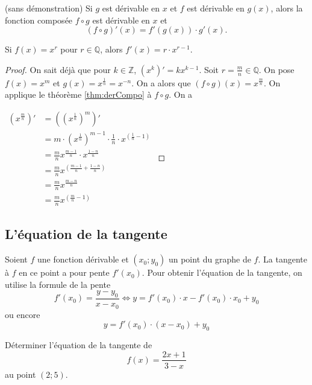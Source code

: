 \documentclass[a4paper,12pt]{article}
\begin{document}
\begin{thm}[label=thm:derCompo]
	(sans démonstration)
	\tcblower
	Si $g$ est dérivable en $x$ et $f$ est dérivable en $g(x)$, alors la fonction composée $f\circ g$ est dérivable en $x$ et
	\[(f\circ g)'(x)=f'(g(x))\cdot g'(x).\]
\end{thm}
\begin{coro}
	\tcblower
	Si $f(x)=x^r$ pour $r\in \mathbb{Q}$, alors $f'(x)=r\cdot x^{r-1}$.
	\medskip
	
	\begin{proof}
		On sait déjà que pour $k\in \mathbb{Z}$, $(x^k)'=kx^{k-1}$. Soit $r=\frac{m}{n}\in \mathbb{Q}$. 
		On pose $f(x)=x^m$ et $g(x)=x^\frac{1}{n}=x^{-n}$. On a alors que $(f\circ g)(x)=x^\frac{m}{n}$. 
		On applique le théorème \ref{thm:derCompo} à $f\circ g$. On a 

$	\begin{aligned}
	\left(x^{\frac{m}{n}}\right)'&=\left(\left(x^{\frac{1}{n}}\right)^m\right)'\\
					      &=m\cdot \left(x^\frac{1}{n}\right)^{m-1}\cdot \frac{1}{n}\cdot x^{\left(\frac{1}{n}-1\right)}\\
					      &=\frac{m}{n}x^\frac{m-1}{n}\cdot x^{\frac{1-n}{n}}\\
					      &=\frac{m}{n}x^{\left(\frac{m-1}{n}+\frac{1-n}{n}\right)}\\
					      &=\frac{m}{n}x^{\frac{m-n}{n}}\\
					      &=\frac{m}{n}x^{\left(\frac{m}{n}-1\right)}
	\end{aligned}$

	\end{proof}
\end{coro}


\subsection{L'équation de la tangente}
\begin{formule}
	\tcblower
Soient $f$ une fonction dérivable et $(x_0;y_0)$ un point du graphe de $f$. La tangente à $f$ en ce point a pour pente $f'(x_0)$. Pour obtenir l'équation de la tangente, on utilise la formule de la pente 
\[
	f'(x_0)=\dfrac{y-y_0}{x-x_0} \iff y=f'(x_0)\cdot x-f'(x_0)\cdot x_0 +y_0 
\]
ou encore
\[y=f'(x_0)\cdot (x-x_0)+y_0\]
\end{formule}
\begin{exemple}
	\tcblower
	Déterminer l'équation de la tangente de 
	\[f(x)=\dfrac{2x+1}{3-x}\]
	au point $(2;5)$. 
	\vspace{4cm}
\end{exemple}
\end{document}
